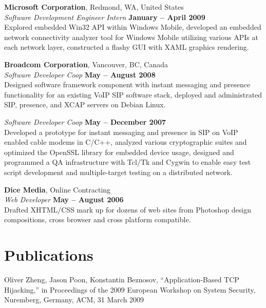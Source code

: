 \documentclass[margin,line]{resume}
\begin{document}
\begin{resume}
    \textbf{Microsoft Corporation}, Redmond, WA, United States \vspace{2mm}\\\vspace{1mm}%
    \textsl{Software Development Engineer Intern} \hfill \textbf{January -- April 2009}\\
    Explored embedded Win32 API within Windows Mobile,
    developed an embedded network connectivity analyzer tool for Windows Mobile utilizing various APIs at each network layer,
    constructed a flashy GUI with XAML graphics rendering.

    \textbf{Broadcom Corporation}, Vancouver, BC, Canada \vspace{2mm}\\\vspace{1mm}%
    \textsl{Software Developer Coop} \hfill \textbf{May -- August 2008}\\
    Designed software framework component with instant messaging and presence functionality for an existing VoIP SIP software stack,
    deployed and administrated SIP, presence, and XCAP servers on Debian Linux.

    \textsl{Software Developer Coop} \hfill \textbf{May -- December 2007}\\
    Developed a prototype for instant messaging and presence in SIP on VoIP enabled cable modems in C/C++,
    analyzed various cryptographic suites and optimized the OpenSSL library for embedded device usage,
    designed and programmed a QA infrastructure with Tcl/Tk and Cygwin to enable easy test script development and multiple-target testing on a distributed network.

    \textbf{Dice Media}, Online Contracting \vspace{2mm}\\\vspace{1mm}%
    \textsl{Web Developer} \hfill \textbf{May -- August 2006}\\
    Drafted XHTML/CSS mark up for dozens of web sites from Photoshop design compositions, cross browser and cross platform compatible.

    \section{\mysidestyle Publications}
    Oliver Zheng, Jason Poon, Konstantin Beznosov, ``Application-Based TCP Hijacking,'' in Proceedings of the 2009 European Workshop on System Security, Nuremberg, Germany, ACM, 31 March 2009


\end{resume}
\end{document}
